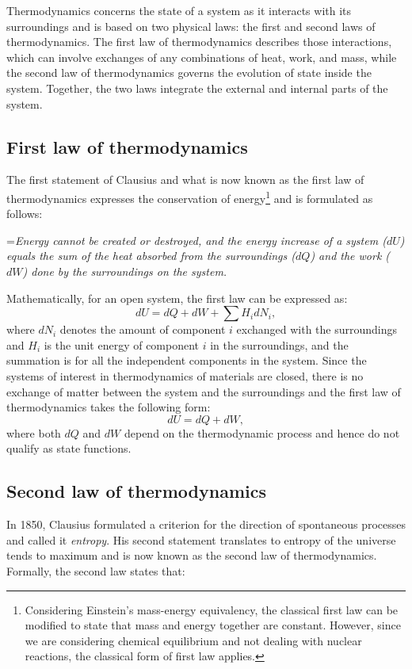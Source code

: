 	Thermodynamics concerns the state of a system as it interacts with its surroundings and is based on two physical laws: the first and second laws of thermodynamics. The first law of thermodynamics describes those interactions, which can involve exchanges of any combinations of heat, work, and mass, while the second law of thermodynamics governs the evolution of state inside the system. Together, the two laws integrate the external and internal parts of the system.

	\subsection{First law of thermodynamics}
	The first statement of Clausius and what is now known as the first law of thermodynamics expresses the conservation of energy\footnote{Considering Einstein's mass-energy equivalency, the classical first law can be modified to state that mass and energy together are constant. However, since we are considering chemical equilibrium and not dealing with nuclear reactions, the classical form of first law applies.} and is formulated as follows:

		\hangindent=\parindent \emph{Energy cannot be created or destroyed, and the energy increase of a system ($dU$) equals the sum of the heat absorbed from the surroundings ($dQ$) and the work ($dW$) done by the surroundings on the system.}

	\noindent Mathematically, for an open system, the first law can be expressed as:
	\begin{equation}\label{eqn:flot}
		dU = dQ + dW + \sum H_i dN_i,
	\end{equation}
	where $dN_i$ denotes the amount of component $i$ exchanged with the surroundings and $H_i$ is the unit energy of component $i$ in the surroundings, and the summation is for all the independent components in the system. Since the systems of interest in thermodynamics of materials are closed, there is no exchange of matter between the system and the surroundings and the first law of thermodynamics takes the following form:
	\begin{equation}\label{eqn:flot1}
		dU = dQ + dW,
	\end{equation}
	where both $dQ$ and $dW$ depend on the thermodynamic process and hence do not qualify as state functions.

	\subsection{Second law of thermodynamics}
	In 1850, Clausius formulated a criterion for the direction of spontaneous processes and called it \emph{entropy}. His second statement translates to entropy of the universe tends to maximum and is now known as the second law of thermodynamics. Formally, the second law states that:


